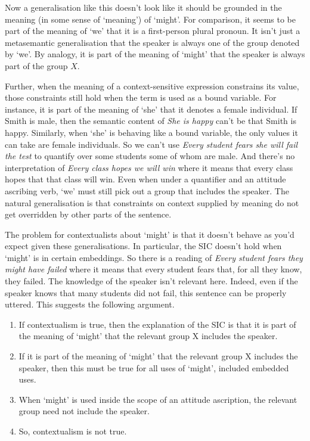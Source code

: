 Now a generalisation like this doesn't look like it should be grounded in the meaning (in some sense of `meaning') of `might'. For comparison, it seems to be part of the meaning of `we' that it is a first-person plural pronoun. It isn't just a metasemantic generalisation that the speaker is always one of the group denoted by `we'. By analogy, it is part of the meaning of `might' that the speaker is always part of the group $X$.

Further, when the meaning of a context-sensitive expression constrains its value, those constraints still hold when the term is used as a bound variable. For instance, it is part of the meaning of `she' that it denotes a female individual. If Smith is male, then the semantic content of \textit{She is happy} can't be that Smith is happy. Similarly, when `she' is behaving like a bound variable, the only values it can take are female individuals. So we can't use \textit{Every student fears she will fail the test} to quantify over some students some of whom are male. And there's no interpretation of \textit{Every class hopes we will win} where it means that every class hopes that that class will win. Even when under a quantifier and an attitude ascribing verb, `we' must still pick out a group that includes the speaker. The natural generalisation is that constraints on context supplied by meaning do not get overridden by other parts of the sentence.

The problem for contextualists about `might' is that it doesn't behave as you'd expect given these generalisations. In particular, the SIC doesn't hold when `might' is in certain embeddings. So there is a reading of \textit{Every student fears they might have failed} where it means that every student fears that, for all they know, they failed. The knowledge of the speaker isn't relevant here. Indeed, even if the speaker knows that many students did not fail, this sentence can be properly uttered. This suggests the following argument.

\begin{enumerate}
\item If contextualism is true, then the explanation of the SIC is that it is part of the meaning of `might' that the relevant group X includes the speaker.
\item If it is part of the meaning of `might' that the relevant group X includes the speaker, then this must be true for all uses of `might', included embedded uses.
\item When `might' is used inside the scope of an attitude ascription, the relevant group need not include the speaker.
\item So, contextualism is not true.
\end{enumerate}


